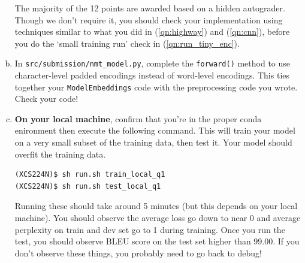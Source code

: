 \begin{enumerate}[(a)]
    The majority of the 12 points are awarded based on a hidden autograder. Though we don't require it, you should check your implementation using techniques similar to what you did in (\ref{qn:highway}) and (\ref{qn:cnn}), before you do the `small training run' check in (\ref{qn:run_tiny_enc}). 

    \item {}
    In \texttt{src/submission/nmt\_model.py}, complete the \texttt{forward()} method to use character-level padded encodings instead of word-level encodings.
    This ties together your \texttt{ModelEmbeddings} code with the preprocessing code you wrote. Check your code!
    
    \item {} \label{qn:run_tiny_enc} \textbf{On your local machine}, confirm that you're in the proper conda enironment then execute the following command. 
    This will train your model on a very small subset of the training data, then test it. Your model should overfit the training data.
\begin{lstlisting}
(XCS224N)$ sh run.sh train_local_q1
(XCS224N)$ sh run.sh test_local_q1
\end{lstlisting}

    Running these should take around 5 minutes (but this depends on your local machine). 
    You should observe the average loss go down to near 0 and average perplexity on train and dev set go to 1 during training. Once you run the test, you should observe BLEU score on the test set higher than 99.00. 
    If you don't observe these things, you probably need to go back to debug!

\end{enumerate}